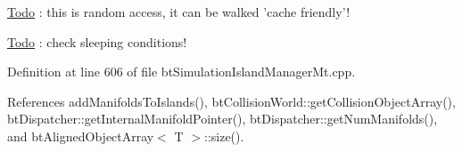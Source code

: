 \begin{Desc}
\item[\hyperlink{todo__todo000036}{Todo}]: this is random access, it can be walked 'cache friendly'! \end{Desc}


\begin{Desc}
\item[\hyperlink{todo__todo000036}{Todo}]: check sleeping conditions! \end{Desc}


Definition at line 606 of file btSimulationIslandManagerMt.cpp.

References addManifoldsToIslands(), btCollisionWorld::getCollisionObjectArray(), btDispatcher::getInternalManifoldPointer(), btDispatcher::getNumManifolds(), and btAlignedObjectArray$<$ T $>$::size().

